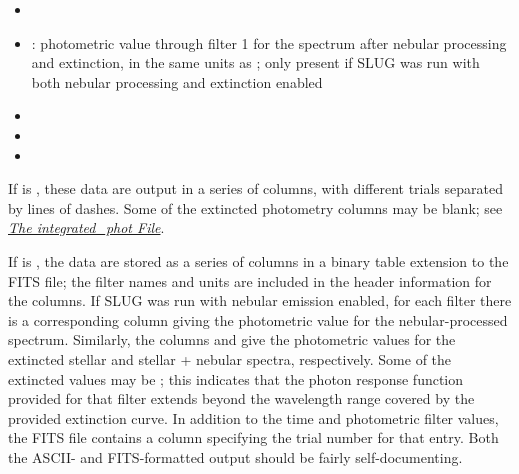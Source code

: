 \documentclass[letterpaper,10pt,english]{sphinxmanual}
\begin{document}
\begin{itemize}
\item {} 

\item {} 
: photometric value through filter 1 for the spectrum after nebular processing and extinction, in the same units as ; only present if SLUG was run with both nebular processing and extinction enabled

\item {} 

\item {} 

\item {} 

\end{itemize}

If  is , these data are output in a series of columns, with different trials separated by lines of dashes. Some of the extincted photometry columns may be blank; see {\hyperref[output:ssec\string-int\string-phot\string-file]{\emph{The integrated\_phot File}}}.

If  is , the data are stored as a series of
columns in a binary table extension to the FITS file; the filter names
and units are included in the header information for the columns. If
SLUG was run with nebular emission enabled, for each filter 
there is a corresponding column  giving the photometric
value for the nebular-processed spectrum. Similarly, the columns
 and  give the photometric values
for the extincted stellar and stellar + nebular spectra, respectively.
Some of the extincted values may be ; this
indicates that the photon response function provided for that filter
extends beyond the wavelength range covered by the provided extinction
curve. In addition to the time and photometric filter values, the FITS
file contains a column specifying the trial number for that
entry. Both the ASCII- and FITS-formatted output should be fairly
self-documenting.
\end{document}

